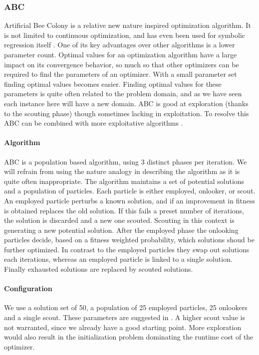 \subsubsection{ABC}
Artificial Bee Colony \citep{ABC} is a relative new nature inspired optimization algorithm. It is not limited to continuous optimization, and has even been used for symbolic regression itself \cite{ABCSR}. One of its key advantages over other algorithms is a lower parameter count. Optimal values for an optimization algorithm have a large impact on its convergence behavior, so much so that other optimizers can be required to find the parameters of an optimizer. With a small parameter set finding optimal values becomes easier. Finding optimal values for these parameters is quite often related to the problem domain, and as we have seen each instance here will have a new domain. ABC is good at exploration (thanks to the scouting phase) though sometimes lacking in exploitation. To resolve this ABC can be combined with more exploitative algorithms \citep{ABCPSO}.
\paragraph{Algorithm}
ABC is a population based algorithm, using 3 distinct phases per iteration. We will refrain from using the nature analogy in describing the algorithm as it is quite often inappropriate. The algorithm maintains a set of potential solutions and a population of particles. Each particle is either employed, onlooker, or scout. An employed particle perturbs a known solution, and if an improvement in fitness is obtained replaces the old solution. If this fails a preset number of iterations, the solution is discarded and a new one scouted. Scouting in this context is generating a new potential solution. After the employed phase the onlooking particles decide, based on a fitness weighted probability, which solutions shoud be further optimized. In contrast to the employed particles they swap out solutions each iterations, whereas an employed particle is linked to a single solution. Finally exhausted solutions are replaced by scouted solutions.
\paragraph{Configuration}
We use a solution set of 50, a population of 25 employed particles, 25 onlookers and a single scout. These parameters are suggested in \citep{ABC}. A higher scout value is not warranted, since we already have a good starting point. More exploration would also result in the initialization problem dominating the runtime cost of the optimizer. 
